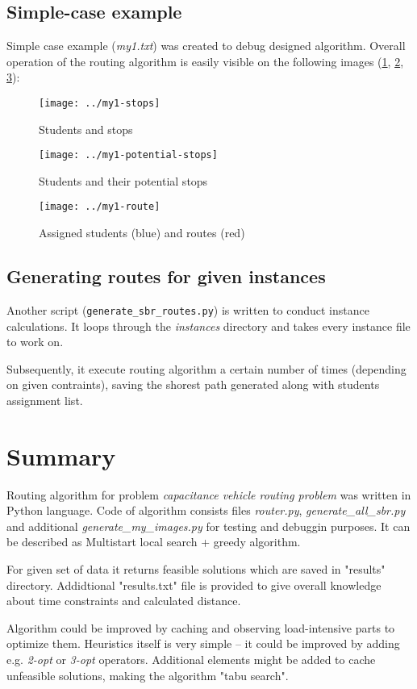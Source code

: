 \documentclass [a4paper, 12pt]{article}
\begin{document}
\subsection{Simple-case example}
Simple case example (\textit{my1.txt}) was created to debug designed algorithm.
Overall operation of the routing algorithm is easily visible on the following images (\ref{fig:fig1}, \ref{fig:fig2}, \ref{fig:fig3}):

\begin{figure}[H]
    \centering
    \texttt{[image: ../my1-stops]}
    \caption{Students and stops}
    \label{fig:fig1}
\end{figure}
\begin{figure}[H]
    \centering
    \texttt{[image: ../my1-potential-stops]}
    \caption{Students and their potential stops}
    \label{fig:fig2}
\end{figure}
\begin{figure}[H]
    \centering
    \texttt{[image: ../my1-route]}
    \caption{Assigned students (blue) and routes (red)}
    \label{fig:fig3}
\end{figure}

\subsection{Generating routes for given instances}
Another script (\texttt{generate_sbr_routes.py}) is written to conduct instance calculations.
It loops through the \textit{instances} directory and takes every instance file to work on.

Subsequently, it execute routing algorithm a certain number of times (depending on given contraints), saving the shorest path generated along with students assignment list.


\section{Summary}
Routing algorithm for problem \textit{capacitance vehicle routing problem} was written in Python language.
Code of algorithm consists files \textit{router.py}, \textit{generate_all_sbr.py} and additional \textit{generate_my_images.py} for testing and debuggin purposes.
It can be described as Multistart local search + greedy algorithm.


For given set of data it returns feasible solutions which are saved in "results" directory.
Addidtional "results.txt" file is provided to give overall knowledge about time constraints and calculated distance.

Algorithm could be improved by caching and observing load-intensive parts to optimize them.
Heuristics itself is very simple -- it could be improved by adding e.g. \textit{2-opt} or \textit{3-opt} operators.
Additional elements might be added to cache unfeasible solutions, making the algorithm "tabu search".
\end{document}
